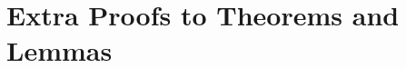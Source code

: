 \documentclass{lectureNotes}
\begin{document}
\newpage
{}
\printbibliography
\nocite{*}

\appendix
\renewcommand{\chapterautorefname}{Appendix}
\renewcommand{\sectionautorefname}{Appendix}
% 
\chapter{Extra Proofs to Theorems and Lemmas}



\end{document}
